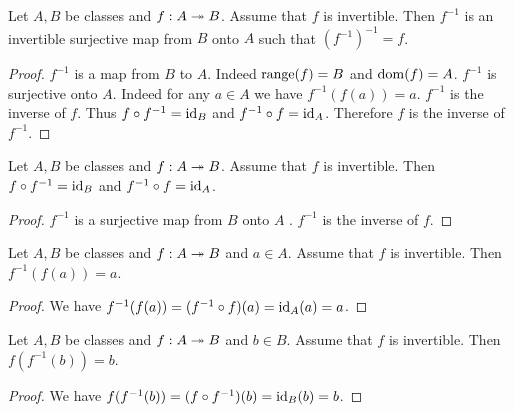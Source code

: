 \documentclass[10pt]{article}
\begin{document}
  \begin{forthel}
    \begin{proposition}[id=FOUNDATIONS_09_8414736098000896,printid]
      Let $A, B$ be classes and $f : A \twoheadrightarrow B$.
      Assume that $f$ is invertible.
      Then $f^{-1}$ is an invertible surjective map from $B$ onto $A$ such that $(f^{-1})^{-1} = f$.
    \end{proposition}
    \begin{proof}
      $f^{-1}$ is a map from $B$ to $A$.
      Indeed $\textrm{range}(f) = B$ and $\operatorname{dom}(f) = A$.
      $f^{-1}$ is surjective onto $A$.
      Indeed for any $a \in A$ we have $f^{-1}(f(a)) = a$.
      $f^{-1}$ is the inverse of $f$.
      Thus $f \circ f^{-1} = \textrm{id}_{B}$ and $f^{-1} \circ f = \textrm{id}_{A}$.
      Therefore $f$ is the inverse of $f^{-1}$.
    \end{proof}
  \end{forthel}

  \begin{forthel}
    \begin{proposition}[id=FOUNDATIONS_09_4577560740495360,printid]
      Let $A, B$ be classes and $f : A \twoheadrightarrow B$.
      Assume that $f$ is invertible.
      Then $f \circ f^{-1} = \textrm{id}_{B}$ and $f^{-1} \circ f = \textrm{id}_{A}$.
    \end{proposition}
    \begin{proof}
      $f^{-1}$ is a surjective map from $B$ onto $A$ .
      $f^{-1}$ is the inverse of $f$.
    \end{proof}
  \end{forthel}

  \begin{forthel}
    \begin{proposition}[id=FOUNDATIONS_09_4606651604664320,printid]
      Let $A, B$ be classes and $f : A \twoheadrightarrow B$ and $a \in A$.
      Assume that $f$ is invertible.
      Then $f^{-1}(f(a)) = a$.
    \end{proposition}
    \begin{proof}
      We have $f^{-1}(f(a)) = (f^{-1} \circ f)(a) = \textrm{id}_{A}(a) = a$.
    \end{proof}

    \begin{proposition}
      Let $A, B$ be classes and $f : A \twoheadrightarrow B$ and $b \in B$.
      Assume that $f$ is invertible.
      Then $f(f^{-1}(b)) = b$.
    \end{proposition}
    \begin{proof}
      We have
      $f(f^{-1}(b))
        = (f \circ f^{-1})(b)
        = \textrm{id}_{B}(b)
        = b$.
    \end{proof}
  \end{forthel}
\end{document}

